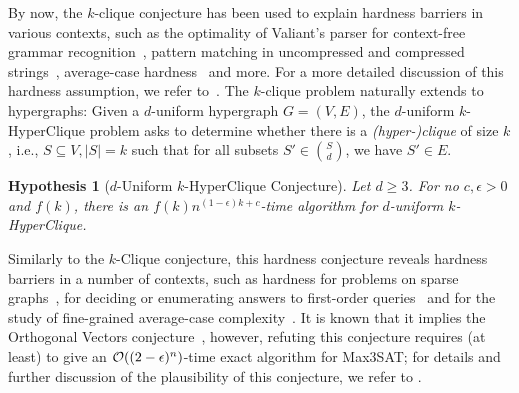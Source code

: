 \documentclass[10pt,a4paper]{article}
\theoremstyle{plain}
\newtheorem{hypo}[thm]{Hypothesis}
\newcommand{\Oh}{{\cal O}}
\newcommand{\eps}{\epsilon}
\begin{document}
  By now, the $k$-clique conjecture has been used to explain hardness barriers in various contexts, such as the optimality of Valiant's parser for context-free grammar recognition~\cite{AbboudBVW18},  pattern matching in uncompressed and compressed strings~\cite{BringmannGL17, AbboudBBK17}, average-case hardness~\cite{Boix-AdseraBB19} and more. 
  For a more detailed discussion of this hardness assumption, we refer to~\cite{AbboudBVW18}.
%
  The $k$-clique problem naturally extends to hypergraphs: Given a $d$-uniform hypergraph $G=(V,E)$, the $d$-uniform $k$-HyperClique problem asks to determine whether there is a \emph{(hyper-)clique} of size $k$, i.e., $S\subseteq V, |S|=k$ such that for all subsets $S' \in {S \choose d}$, we have $S'\in E$. 
%
\begin{hypo}[$d$-Uniform $k$-HyperClique Conjecture]
Let $d\ge 3$. For no $c,\eps > 0$ and $f(k)$, there is an $f(k)n^{(1 - \epsilon)k+c}$-time algorithm for $d$-uniform $k$-HyperClique.
\end{hypo}
%
Similarly to the $k$-Clique conjecture, this hardness conjecture reveals hardness barriers in a number of contexts, such as hardness for problems on sparse graphs~\cite{LincolnVWW18}, for deciding or enumerating answers to first-order queries~\cite{BringmannFK19, CarmeliK19} and for the study of fine-grained average-case complexity~\cite{Boix-AdseraBB19}. It is known that it implies the Orthogonal Vectors conjecture~\cite{AbboudBDN18}, however, refuting this conjecture requires (at least) to give an $\Oh((2-\eps)^n)$-time exact algorithm for Max3SAT; for details and further discussion of the plausibility of this conjecture, we refer to \cite{LincolnVWW18}.   
%

\setcounter{section}{2}
\end{document}
